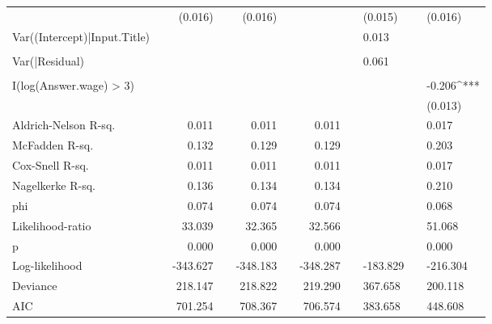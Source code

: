 \begin{tabular}{lcD{.}{.}{7}cD{.}{.}{7}cD{.}{.}{7}}
                             &  &  (0.016)     &&  (0.016)     &&              &&  (0.015)     &&  (0.016)    \\
Var((Intercept)|Input.Title) &  &              &&              &&              &&   0.013      &&             \\
                             &  &              &&              &&              &&              &&             \\
Var(|Residual)               &  &              &&              &&              &&   0.061      &&             \\
                             &  &              &&              &&              &&              &&             \\
I(log(Answer.wage) > 3)      &  &              &&              &&              &&              && -0.206^{***}\\
                             &  &              &&              &&              &&              &&  (0.013)    \\
\midrule
Aldrich-Nelson R-sq.         &  &      0.011   &&      0.011   &&      0.011   &&              &&      0.017  \\
McFadden R-sq.               &  &      0.132   &&      0.129   &&      0.129   &&              &&      0.203  \\
Cox-Snell R-sq.              &  &      0.011   &&      0.011   &&      0.011   &&              &&      0.017  \\
Nagelkerke R-sq.             &  &      0.136   &&      0.134   &&      0.134   &&              &&      0.210  \\
phi                          &  &      0.074   &&      0.074   &&      0.074   &&              &&      0.068  \\
Likelihood-ratio             &  &     33.039   &&     32.365   &&     32.566   &&              &&     51.068  \\
p                            &  &      0.000   &&      0.000   &&      0.000   &&              &&      0.000  \\
Log-likelihood               &  &   -343.627   &&   -348.183   &&   -348.287   &&   -183.829   &&   -216.304  \\
Deviance                     &  &    218.147   &&    218.822   &&    219.290   &&    367.658   &&    200.118  \\
AIC                          &  &    701.254   &&    708.367   &&    706.574   &&    383.658   &&    448.608  \\

\end{tabular}
